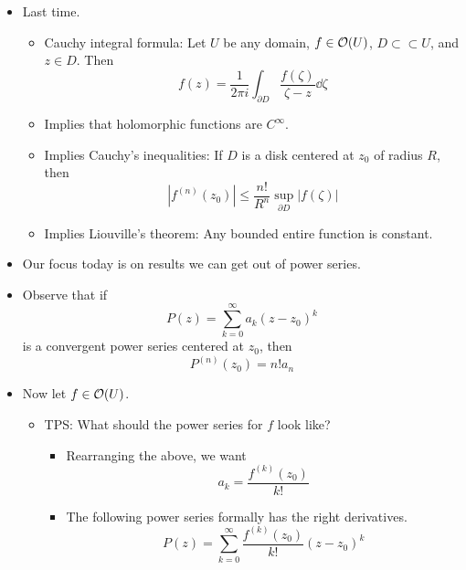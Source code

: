 \documentclass[../notes.tex]{subfiles}
\begin{document}
\begin{itemize}
    \item {}Last time.
    \begin{itemize}
        \item Cauchy integral formula: Let $U$ be any domain, $f\in\mathcal{O}(U)$, $D\subset\subset U$, and $z\in D$. Then
        \begin{equation*}
            f(z) = \frac{1}{2\pi i}\int_{\partial D}\frac{f(\zeta)}{\zeta-z}\dd\zeta
        \end{equation*}
        \item Implies that holomorphic functions are $C^\infty$.
        \item Implies Cauchy's inequalities: If $D$ is a disk centered at $z_0$ of radius $R$, then
        \begin{equation*}
            |f^{(n)}(z_0)| \leq \frac{n!}{R^n}\sup_{\partial D}|f(\zeta)|
        \end{equation*}
        \item Implies Liouville's theorem: Any bounded entire function is constant.
    \end{itemize}
    \item Our focus today is on results we can get out of power series.
    \item Observe that if
    \begin{equation*}
        P(z) = \sum_{k=0}^\infty a_k(z-z_0)^k
    \end{equation*}
    is a convergent power series centered at $z_0$, then
    \begin{equation*}
        P^{(n)}(z_0) = n!a_n
    \end{equation*}
    \item Now let $f\in\mathcal{O}(U)$.
    \begin{itemize}
        \item TPS: What should the power series for $f$ look like?
        \begin{itemize}
            \item Rearranging the above, we want
            \begin{equation*}
                a_k = \frac{f^{(k)}(z_0)}{k!}
            \end{equation*}
            \item The following power series formally has the right derivatives.
            \begin{equation*}
                P(z) = \sum_{k=0}^\infty\frac{f^{(k)}(z_0)}{k!}(z-z_0)^k
            \end{equation*}

\end{itemize}
\end{itemize}
\end{itemize}
\end{document}
